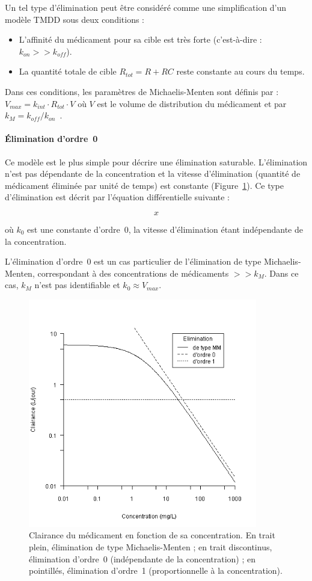 Un tel type d'élimination peut être considéré comme une simplification d'un modèle TMDD sous deux conditions :
\begin{itemize}
\item L'affinité du médicament pour sa cible est très forte (c'est-à-dire : $k_{on} >> k_{off}$).
\item La quantité totale de cible $R_{tot} =  R + RC$ reste constante au cours du temps.
\end{itemize}
Dans ces conditions, les paramètres de Michaelis-Menten sont définis par : $V_{max} = k_{int}\cdot R_{tot}\cdot V$ où $V$ est le volume de distribution du médicament et par $k_M = k_{off} /k_{on}$~\citep{REF4, REF6}.
\paragraph{Élimination d'ordre~0} Ce modèle est le plus simple pour décrire une élimination saturable. L'élimination n'est pas dépendante de la concentration et la vitesse d'élimination (quantité de médicament éliminée par unité de temps) est constante (Figure~\ref{fig:8}). Ce type d'élimination est décrit par l'équation différentielle suivante :

\begin{equation}
x
\label{eq:35}
\end{equation}

où $k_0$ est une constante d'ordre~0, la vitesse d'élimination étant indépendante de la concentration.

L'élimination d'ordre~0 est un cas particulier de l'élimination de type Michaelis-Menten, correspondant à des concentrations de médicaments $>> k_M$. Dans ce cas, $k_M$ n'est pas identifiable et $k_0 \approx V_{max}$.

\begin{figure}[htbp]
	\centering
		\includegraphics[width=10cm]{figures/raster/FIG_8}
	\caption[Clairance du médicament en fonction de sa concentration.]{Clairance du médicament en fonction de sa concentration. En trait plein, élimination de type Michaelis-Menten ; en trait discontinus, élimination d'ordre~0 (indépendante de la concentration) ; en pointillés, élimination d'ordre~1 (proportionnelle à la concentration).}
	\label{fig:8}
\end{figure}

